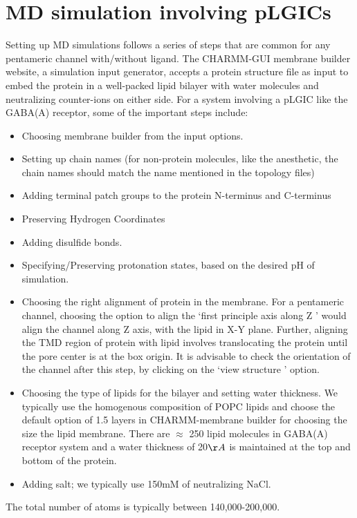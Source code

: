 \documentclass[12pt]{article}
\begin{document}
\section{MD simulation involving pLGICs}
\label{sec:genMD}
Setting up MD simulations follows a series of steps that are common for any pentameric channel with/without ligand. The CHARMM-GUI membrane builder website\cite{Jo2009}, a simulation input generator, accepts a protein structure file as input to embed the protein in a well-packed lipid bilayer with water molecules and neutralizing counter-ions on either side. For a system involving a pLGIC like the GABA(A) receptor, some of the important steps include:
 	\begin{itemize}
		\item Choosing membrane builder from the input options.
		\item Setting up chain names (for non-protein molecules, like the anesthetic, the chain names should match the name mentioned in the topology files)
		\item Adding terminal patch groups to the protein N-terminus and C-terminus
		\item Preserving Hydrogen Coordinates
		\item Adding disulfide bonds.
		\item Specifying/Preserving protonation states, based on the desired pH of simulation. 
		\item Choosing the right alignment of protein in the membrane. For a pentameric channel, choosing the option to align the `first principle axis along Z ' would align the channel along Z axis, with the lipid in X-Y plane. Further, aligning the TMD region of protein with lipid involves  translocating the protein until the pore center is at the box origin. %
		It is advisable to check the orientation of the channel after this step, by clicking on the `view structure ' option.
		\item Choosing the type of lipids for the bilayer and setting water thickness. We typically use the homogenous composition of POPC lipids and choose the default option of  1.5 layers in CHARMM-membrane builder for choosing the size the lipid membrane. There are $\approx$ 250 lipid molecules in GABA(A) receptor system and a water thickness of 20$\AA$ is maintained at the top and bottom of the protein.
		\item Adding salt; we typically use 150mM of neutralizing NaCl.  
	\end{itemize}
The total number of atoms is typically between 140,000-200,000.  
\end{document}
